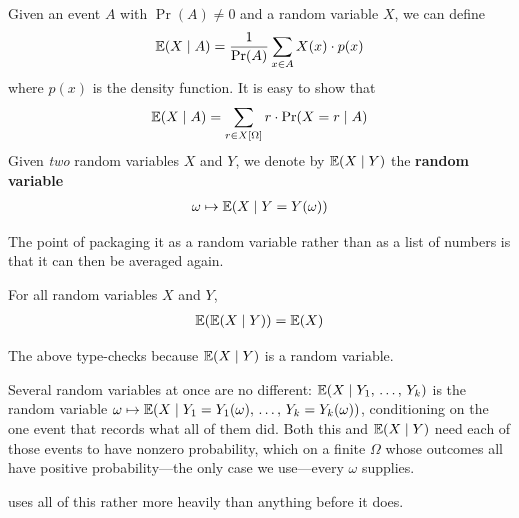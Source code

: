 Given an event $A$ with $\Pr(A) \neq 0$ and a random variable $X$, we can define
\begin{align*}
    \mathbb{E}\!\left( X \mid A \right) = \frac{1}{\Pr(A)} \sum_{x \in A} X(x) \cdot p(x)
\end{align*}
where $p(x)$ is the density function. It is easy to show that
\begin{align*}
    \mathbb{E}\!\left( X \mid A \right) = \sum_{r \in X[\Omega]} r \cdot \Pr\!\left( X = r \mid A \right)
\end{align*}
Given \textit{two} random variables $X$ and $Y$, we denote by $\mathbb{E}\!\left( X \mid Y \right)$ the \textbf{random variable}
\begin{align*}
    \omega \mapsto \mathbb{E}\!\left( X \mid Y = Y(\omega) \right)
\end{align*}

The point of packaging it as a random variable rather than as a list of numbers is that it can then be averaged again.

\begin{boxtheorem}
    For all random variables $X$ and $Y$,
    \begin{align*}
        \mathbb{E}\!\left( \mathbb{E}\!\left( X \mid Y \right) \right) = \mathbb{E}(X)
    \end{align*}
\end{boxtheorem}

The above type-checks because $\mathbb{E}\!\left( X \mid Y \right)$ is a random variable.

Several random variables at once are no different: $\mathbb{E}\!\left( X \mid Y_1, \, \ldots, \, Y_k \right)$ is the random variable $\omega \mapsto \mathbb{E}\!\left( X \mid Y_1 = Y_1(\omega), \, \ldots, \, Y_k = Y_k(\omega) \right)$, conditioning on the one event that records what all of them did. Both this and $\mathbb{E}\!\left( X \mid Y \right)$ need each of those events to have nonzero probability, which on a finite $\Omega$ whose outcomes all have positive probability---the only case we use---every $\omega$ supplies.

 uses all of this rather more heavily than anything before it does.
